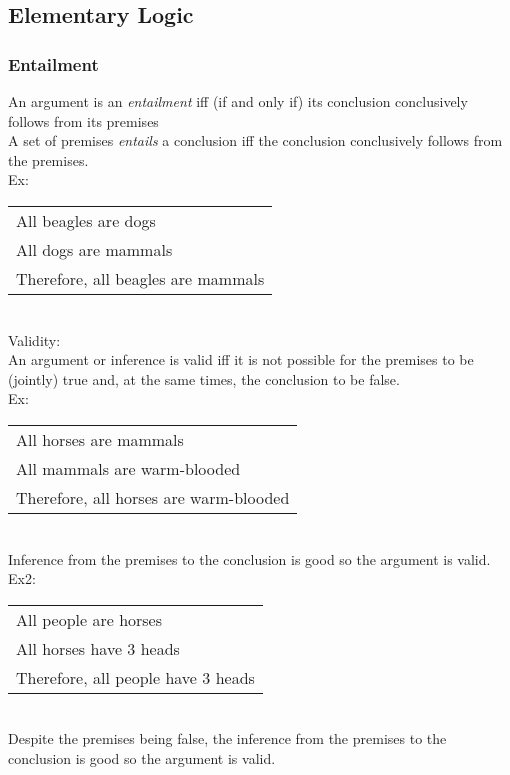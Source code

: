 \subsection{Elementary Logic}
\subsubsection{Entailment}
An argument is an \textit{entailment} iff (if and only if) its conclusion conclusively follows from its premises\\
A set of premises \textit{entails} a conclusion iff the conclusion conclusively follows from the premises.\\
Ex:\\
\begin{tabular}{p{8cm}}
    All beagles are dogs\\
    All dogs are mammals\\
    \hline
    Therefore, all beagles are mammals
\end{tabular}\\
Validity:\\
An argument or inference is valid iff it is not possible for the premises to be (jointly) true and, at the same times, the conclusion to be false.\\

Ex:\\
\begin{tabular}{p{8cm}}
    All horses are mammals\\
    All mammals are warm-blooded\\
    \hline
    Therefore, all horses are warm-blooded
\end{tabular}\\
Inference from the premises to the conclusion is good so the argument is valid.\\

Ex2:\\
\begin{tabular}{p{8cm}}
    All people are horses\\
    All horses have 3 heads\\
    \hline
    Therefore, all people have 3 heads
\end{tabular}\\
Despite the premises being false, the inference from the premises to the conclusion is good so the argument is valid.\\

